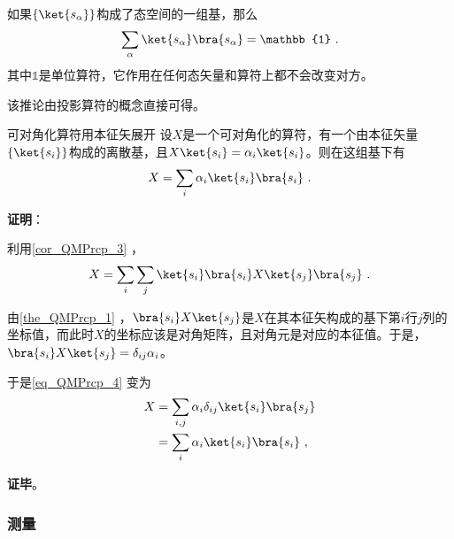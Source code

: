\begin{corollary}{}\label{cor_QMPrcp_3}
如果$\{\ket{s_\alpha}\}$构成了态空间的一组基，那么
\begin{equation}
\sum_\alpha \ket{s_\alpha}\bra{s_\alpha} = \mathbb{1}~.
\end{equation}
其中$\mathbb{1}$是单位算符，它作用在任何态矢量和算符上都不会改变对方。
\end{corollary}

该推论由投影算符的概念直接可得。



\begin{corollary}{可对角化算符用本征矢展开}\label{cor_QMPrcp_2}
设$X$是一个可对角化的算符，有一个由本征矢量$\{\ket{s_i}\}$构成的离散基，且$X\ket{s_i}=\alpha_i\ket{s_i}$。则在这组基下有
\begin{equation}
X=\sum_{i}\alpha_i\ket{s_i}\bra{s_i}~.
\end{equation}
\end{corollary}

\textbf{证明}：


利用\autoref{cor_QMPrcp_3} ，
\begin{equation}\label{eq_QMPrcp_4}
X=\sum_{i}\sum_{j}\ket{s_i}\bra{s_i}X\ket{s_j}\bra{s_j}~.
\end{equation}

由\autoref{the_QMPrcp_1} ，$\bra{s_i}X\ket{s_j}$是$X$在其本征矢构成的基下第$i$行$j$列的坐标值，而此时$X$的坐标应该是对角矩阵，且对角元是对应的本征值。于是，$\bra{s_i}X\ket{s_j}=\delta_{ij}\alpha_i$。

于是\autoref{eq_QMPrcp_4} 变为
\begin{equation}
\begin{aligned}
X&=\sum_{i, j}\alpha_i\delta_{ij}\ket{s_i}\bra{s_j}\\
&=\sum_i\alpha_i\ket{s_i}\bra{s_i}~,
\end{aligned}
\end{equation}

\textbf{证毕}。










\subsubsection{测量}

